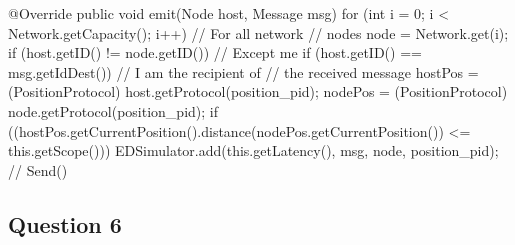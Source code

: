 \documentclass[10pt]{report}
\begin{document}
\noindent\begin{minipage}{\textwidth}
\begin{shaded}
\begin{boxedlisting}
@Override
public void emit(Node host, Message msg) {
	for (int i = 0; i < Network.getCapacity(); i++) { // For all network
															// nodes
		node = Network.get(i);
		if (host.getID() != node.getID()) { // Except me
			if (host.getID() == msg.getIdDest()) { // I am the recipient of
														// the received message
				hostPos = (PositionProtocol) host.getProtocol(position_pid);
				nodePos = (PositionProtocol) node.getProtocol(position_pid);
				if ((hostPos.getCurrentPosition().distance(nodePos.getCurrentPosition()) <= this.getScope())) {
					EDSimulator.add(this.getLatency(), msg, node, position_pid); // Send()
				}
			}
		}
	}
}
\end{boxedlisting}
\end{shaded}
\end{minipage}

\subsection{Question 6}
\end{document}
